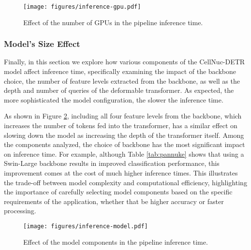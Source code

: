 \begin{figure}[h]
    \centering
    \texttt{[image: figures/inference-gpu.pdf]}
    \caption{Effect of the number of GPUs in the pipeline inference time.}
    \label{fig:results:inference-gpu}
\end{figure}

\subsubsection{Model's Size Effect}
\label{sec:results:time:size}

Finally, in this section we explore how various components of the CellNuc-DETR model affect inference time, specifically examining the impact of the backbone choice, the number of feature levels extracted from the backbone, as well as the depth and number of queries of the deformable transformer. As expected, the more sophisticated the model configuration, the slower the inference time. 

As shown in Figure \ref{fig:results:inference-model}, including all four feature levels from the backbone, which increases the number of tokens fed into the transformer, has a similar effect on slowing down the model as increasing the depth of the transformer itself. Among the components analyzed, the choice of backbone has the most significant impact on inference time. For example, although Table \ref{tab:pannuke} shows that using a Swin-Large backbone results in improved classification performance, this improvement comes at the cost of much higher inference times. This illustrates the trade-off between model complexity and computational efficiency, highlighting the importance of carefully selecting model components based on the specific requirements of the application, whether that be higher accuracy or faster processing.

\begin{figure}
    \centering
    \texttt{[image: figures/inference-model.pdf]}
    \caption{Effect of the model components in the pipeline inference time.}
    \label{fig:results:inference-model}
\end{figure}